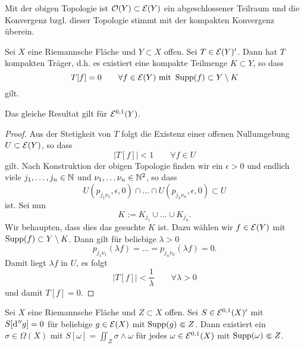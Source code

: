 \begin{cor}
  Mit der obigen Topologie ist $\mathcal{O}(Y) \subset \mathcal{E}(Y)$ ein
  abgeschlossener Teilraum und die Konvergenz bzgl. dieser Topologie
  stimmt mit der kompakten Konvergenz überein.
\end{cor}

\begin{lemma}
  \label{lemma:kompakter-träger-funktional}
  Sei $X$ eine Riemannsche Fläche und $Y \subset X$ offen. Sei $T \in
  \mathcal{E}(Y)'$. 
  Dann hat $T$ kompakten Träger, d.h. es existiert eine kompakte
  Teilmenge $K \subset Y$, so dass
  \[
  T[f] = 0 \qquad \forall f \in \mathcal{E}(Y) \text{ mit } \operatorname{Supp}(f) \subset
  Y \setminus K
  \]
  gilt.
  
  Das gleiche Resultat gilt für $\mathcal{E}^{0,1}(Y)$.
\end{lemma}

\begin{proof}
  Aus der Stetigkeit von $T$ folgt die Existenz einer offenen
  Nullumgebung $U \subset \mathcal{E}(Y)$, so dass
  \[
  |T[f]| < 1 \qquad \forall f \in U
  \]
  gilt. Nach Konstruktion der obigen Topologie finden wir ein $\epsilon > 0$
  und endlich viele $j_1, \dots, j_n \in \mathbb{N}$ und $\nu_1, \dots \nu_n
  \in \mathbb{N}^2$, so dass 
  \[
  U(p_{j_1\nu_1}, \epsilon, 0) \cap \dots \cap
  U(p_{j_n\nu_n}, \epsilon, 0) \subset U
  \]
  ist. Sei nun
  \[
  K := K_{j_1} \cup \dots \cup K_{j_n}.
  \]
  Wir behaupten, dass
  dies das gesuchte $K$ ist. 
  Dazu wählen wir $f \in \mathcal{E}(Y)$ mit $\operatorname{Supp}(f) \subset Y \setminus
  K$. Dann gilt für beliebige
  $\lambda > 0$
  \[
  p_{j_1\nu_1}(\lambda f) = \dots = p_{j_n\nu_n}(\lambda f) = 0.
  \]
  Damit liegt $\lambda f$ in $U$, es folgt
  \[
  |T[f]| < \frac1\lambda \qquad \forall \lambda >0
  \]
  und damit $T[f] = 0$.
\end{proof}

\begin{lemma}
  \label{lemma:funktional-explizit}
  Sei $X$ eine Riemannsche Fläche und $Z \subset X$ offen. Sei $S \in
  \mathcal{E}^{0,1}(X)'$ mit $S[\d[''g]] = 0$ für beliebige $g \in \mathcal{E}(X)$
  mit $\operatorname{Supp}(g) \Subset Z$. 
  Dann existiert ein $\sigma \in \Omega(X)$ mit $S[\omega] = \iint_Z
  \sigma \wedge \omega$ für jedes $\omega \in \mathcal{E}^{0,1}(X)$ mit
  $\operatorname{Supp}(\omega) \Subset Z$.
\end{lemma}

